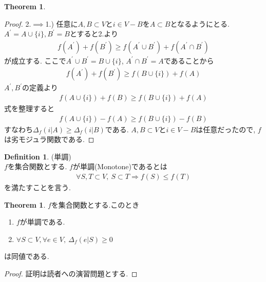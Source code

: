 \documentclass[11pt, a4paper, dvipdfmx]{jsarticle}
\theoremstyle{definition}
\newtheorem{Definition+}[Axiom+]{Definition}
\newtheorem{Theorem+}[Axiom+]{Theorem}
\begin{document}
\begin{Theorem+}
\begin{proof}
        2.$\implies$1.) 任意に$A, B\subset V$と$i\in V - B$を$A\subset B$となるようにとる. $A^{'} = A\cup \{i\}, B^{'} = B$とすると2.より
        \begin{align*}
            f(A^{'}) + f(B^{'})\geq f(A^{'}\cup B^{'}) + f(A^{'}\cap B^{'})
        \end{align*}
        が成立する. ここで$A^{'}\cup B^{'} = B\cup\{i\}$, $A^{'}\cap B^{'} = A$であることから
        \begin{align*}
            f(A^{'}) + f(B^{'})\geq f(B\cup\{i\}) + f(A)
        \end{align*}
        $A^{'}, B^{'}$の定義より
        \begin{align*}
            f(A\cup \{i\}) + f(B)\geq f(B\cup\{i\}) + f(A)
        \end{align*}
        式を整理すると
        \begin{align*}
            f(A\cup \{i\}) - f(A)\geq f(B\cup\{i\}) - f(B)
        \end{align*}
        すなわち$\Delta_{f}(i | A)\geq\Delta_{f}(i | B)$である. $A, B\subset V$と$i\in V - B$は任意だったので, 
        $f$は劣モジュラ関数である.
    \end{proof}
\end{Theorem+}
\begin{Definition+}(単調)\\
    $f$を集合関数とする. $f$が単調(Monotone)であるとは
    \begin{align*}
        \forall S, T\subset V,~ S\subset T\Longrightarrow f(S)\leq f(T)
    \end{align*}
    を満たすことを言う.
\end{Definition+}
\begin{Theorem+}
    $f$を集合関数とする.このとき
    \begin{enumerate}
        \item $f$が単調である.
        \item $\forall S\subset V, \forall e\in V,~ \Delta_{f}(e | S)\geq 0$
    \end{enumerate}
    は同値である.
    \begin{proof}
        証明は読者への演習問題とする.
    \end{proof}
\end{Theorem+}
\end{document}
